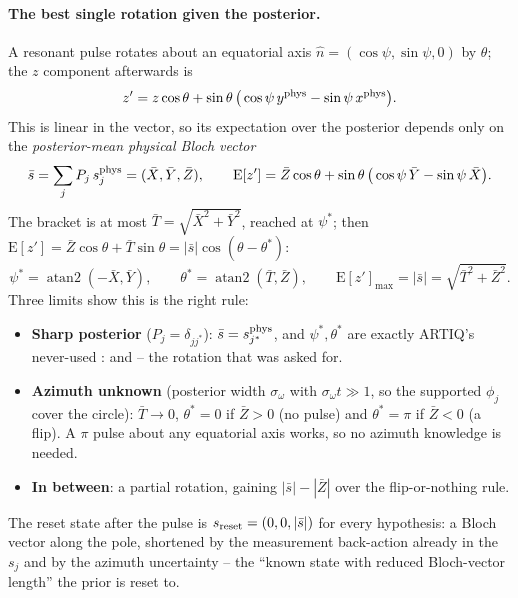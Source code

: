 \paragraph{The best single rotation given the posterior.} A resonant pulse
rotates about an equatorial axis $\hat n = (\cos\psi, \sin\psi, 0)$ by $\theta$;
the $z$ component afterwards is
\[
  z' = z\cos\theta + \sin\theta\,\big(\cos\psi\,y^{\rm phys} - \sin\psi\,x^{\rm phys}\big).
\]
This is linear in the vector, so its expectation over the posterior depends
only on the \emph{posterior-mean physical Bloch vector}
\[
  \bar s = \sum_j P_j\, s_j^{\rm phys} = (\bar X, \bar Y, \bar Z),\qquad
  \mathrm{E}[z'] = \bar Z\cos\theta + \sin\theta\,\big(\cos\psi\,\bar Y - \sin\psi\,\bar X\big).
\]
The bracket is at most $\bar T = \sqrt{\bar X^2 + \bar Y^2}$, reached at $\psi^*$;
then $\mathrm{E}[z'] = \bar Z\cos\theta + \bar T\sin\theta = |\bar s|\cos(\theta - \theta^*)$:
\[
  \psi^* = \operatorname{atan2}(-\bar X, \bar Y),\qquad
  \theta^* = \operatorname{atan2}(\bar T, \bar Z),\qquad
  \mathrm{E}[z']_{\max} = |\bar s| = \sqrt{\bar T^2 + \bar Z^2}.
\]
Three limits show this is the right rule:
\begin{itemize}[nosep]
  \item \textbf{Sharp posterior} ($P_j = \delta_{jj^*}$): $\bar s = s_{j^*}^{\rm phys}$,
    and $\psi^*, \theta^*$ are exactly ARTIQ's never-used
    :  and
     -- the rotation that was asked for.
  \item \textbf{Azimuth unknown} (posterior width $\sigma_\omega$ with $\sigma_\omega t
    \gg 1$, so the supported $\phi_j$ cover the circle): $\bar T \to 0$, $\theta^* = 0$
    if $\bar Z > 0$ (no pulse) and $\theta^* = \pi$ if $\bar Z < 0$ (a flip). A $\pi$
    pulse about any equatorial axis works, so no azimuth knowledge is needed.
  \item \textbf{In between}: a partial rotation, gaining $|\bar s| - |\bar Z|$ over
    the flip-or-nothing rule.
\end{itemize}
The reset state after the pulse is $s_{\rm reset} = (0, 0, |\bar s|)$ for every
hypothesis: a Bloch vector along the pole, shortened by the measurement
back-action already in the $s_j$ and by the azimuth uncertainty -- the
``known state with reduced Bloch-vector length'' the prior is reset to.

